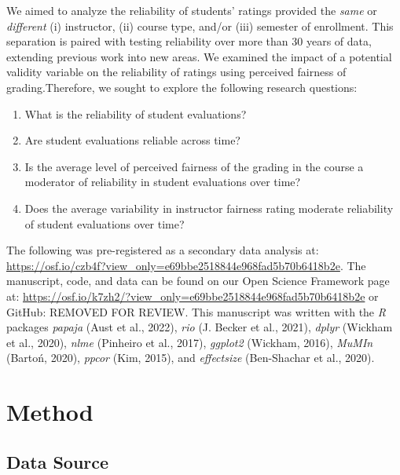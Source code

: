 \documentclass[
  man,mask]{apa7}
\providecommand{\tightlist}{%
  \setlength{\itemsep}{0pt}\setlength{\parskip}{0pt}}
\begin{document}
We aimed to analyze the reliability of students' ratings provided the \emph{same} or \emph{different} (i) instructor, (ii) course type, and/or (iii) semester of enrollment. This separation is paired with testing reliability over more than 30 years of data, extending previous work into new areas. We examined the impact of a potential validity variable on the reliability of ratings using perceived fairness of grading.Therefore, we sought to explore the
following research questions:

\begin{enumerate}
\def\labelenumi{\arabic{enumi})}
\tightlist
\item
  What is the reliability of student evaluations?
\item
  Are student evaluations reliable across time?
\item
  Is the average level of perceived fairness of the grading in the
  course a moderator of reliability in student evaluations over time?
\item
  Does the average variability in instructor fairness rating moderate
  reliability of student evaluations over time?
\end{enumerate}

The following was pre-registered as a secondary data analysis at:
\url{https://osf.io/czb4f?view_only=e69bbe2518844e968fad5b70b6418b2e}. The manuscript, code, and data can be found on
our Open Science Framework page at: \url{https://osf.io/k7zh2/?view_only=e69bbe2518844e968fad5b70b6418b2e} or GitHub:
REMOVED FOR REVIEW. This manuscript was written
with the \emph{R} packages \emph{papaja} (Aust et al., 2022), \emph{rio} (J. Becker et al., 2021), \emph{dplyr}
(Wickham et al., 2020), \emph{nlme} (Pinheiro et al., 2017), \emph{ggplot2} (Wickham, 2016), \emph{MuMIn}
(Bartoń, 2020), \emph{ppcor} (Kim, 2015), and \emph{effectsize} (Ben-Shachar et al., 2020).

\section{Method}\label{method}

\subsection{Data Source}\label{data-source}
\end{document}

